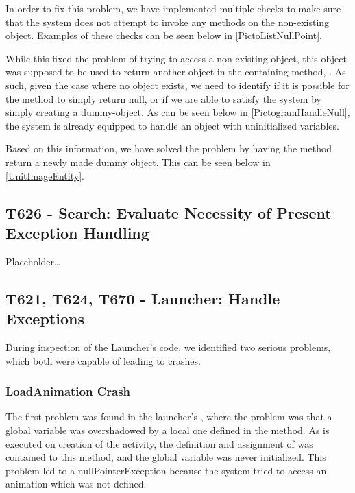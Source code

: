 In order to fix this problem, we have implemented multiple checks to make sure
that the system does not attempt to invoke any methods on the non-existing
object. Examples of these checks can be seen below in
\autoref{PictoListNullPoint}.


While this fixed the problem of trying to access a non-existing object, this
object was supposed to be used to return another object in the containing
method, .
As such, given the case where no object exists, we need to identify if it is
possible for the method to simply return null, or if we are able to satisfy the
system by simply creating a dummy-object. As can be seen below in
\autoref{PictogramHandleNull}, the system is already equipped to handle an
object with uninitialized variables.


Based on this information, we have solved the problem by having the
 method return a newly made dummy object. This can be seen below
in \autoref{UnitImageEntity}.


\subsection{T626 - Search: Evaluate Necessity of Present Exception Handling}
Placeholder\ldots

\subsection{T621, T624, T670 - Launcher: Handle Exceptions}
During inspection of the Launcher's code, we identified two serious problems,
which both were capable of leading to crashes.

\subsubsection{LoadAnimation Crash}
The first problem was found in the launcher's , where the
problem was that a global variable  was overshadowed by a
local one defined in the  method. As  is
executed on creation of the activity, the definition and assignment of
 was contained to this method, and the global variable was
never initialized. This problem led to a nullPointerException because the system
tried to access an animation which was not defined.\nl


